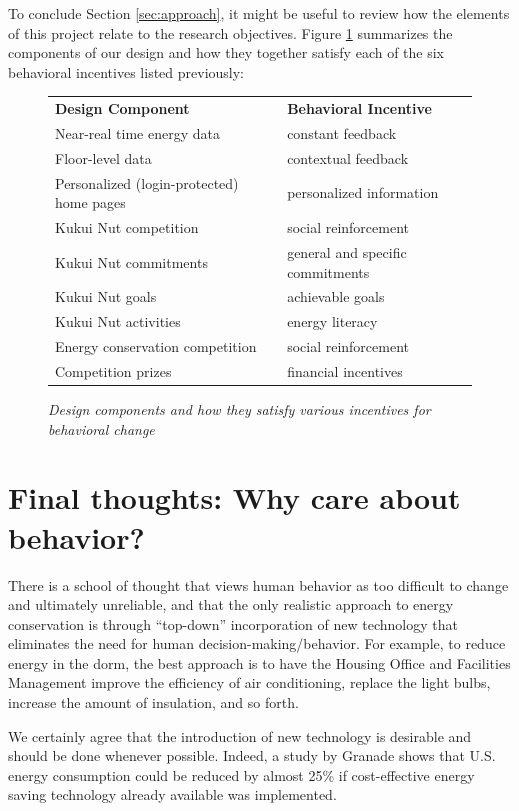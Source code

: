 \documentclass[11pt]{article}
\begin{document}
To conclude Section \ref{sec:approach}, it might be useful to review how the
elements of this project relate to the research objectives.  Figure
\ref{fig:incentives} summarizes the components of our design and how they
together satisfy each of the six behavioral incentives listed previously:

\begin{figure}[!ht]
\small
\begin{tabular}{p{3in}p{3in}} \hline
{\bf Design Component} & {\bf Behavioral Incentive}  \\
Near-real time energy data & constant feedback \\
Floor-level data & contextual feedback  \\
Personalized (login-protected) home pages  & personalized information \\
Kukui Nut competition & social reinforcement \\ 
Kukui Nut commitments & general and specific commitments \\
Kukui Nut goals & achievable goals \\ 
Kukui Nut activities & energy literacy \\ 
Energy conservation competition & social reinforcement \\
Competition prizes & financial incentives  \\ \hline
\end{tabular}
\normalsize
\caption{{\em Design components and how they satisfy various incentives for behavioral change}}
\label{fig:incentives}
\end{figure}

\section{Final thoughts: Why care about behavior?}

There is a school of thought that views human behavior as too difficult to
change and ultimately unreliable, and that the only realistic approach to
energy conservation is through ``top-down'' incorporation of new technology
that eliminates the need for human decision-making/behavior.  For example,
to reduce energy in the dorm, the best approach is to have the Housing
Office and Facilities Management improve the efficiency of air
conditioning, replace the light bulbs, increase the amount of insulation,
and so forth.

We certainly agree that the introduction of new technology is desirable and
should be done whenever possible.  Indeed, a study by Granade \cite{Granade09}
shows that U.S. energy consumption could be reduced by almost 25\% if
cost-effective energy saving technology already available was implemented.
\end{document}
